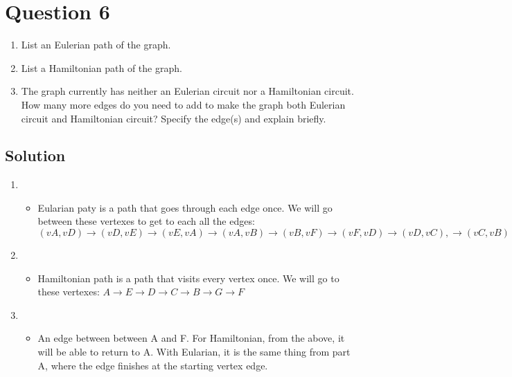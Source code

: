 \documentclass[11pt]{article}
\begin{document}
\clearpage
\section*{Question 6}

    \begin{enumerate}[label=(\alph*)]
        \item List an Eulerian path of the graph.
        \item List a Hamiltonian path of the graph.
        \item The graph currently has neither an Eulerian circuit nor a Hamiltonian circuit. How many more edges do you need to add to make the graph both Eulerian circuit and Hamiltonian circuit? Specify the edge(s) and explain briefly.
    \end{enumerate}

    \subsection*{Solution}
    \begin{enumerate}[label=(\alph*)]
        \item
        \begin{itemize}
            \item[] Eularian paty is a path that goes through each edge once. We will go between these vertexes to get to each all the edges:
            \((vA,vD) \rightarrow(vD, vE) \rightarrow (vE,vA) \rightarrow(vA,vB) \rightarrow (vB,vF) \rightarrow(vF,vD) \rightarrow(vD,vC), \rightarrow (vC,vB) \rightarrow (vvB,vG) \rightarrow (vG.vF)\)
        \end{itemize}
        \item
        \begin{itemize}
            \item[] Hamiltonian path is a path that visits every vertex once. We will go to these vertexes: \(A \rightarrow E \rightarrow D \rightarrow C \rightarrow B \rightarrow G \rightarrow F\)
        \end{itemize}
        \item
        \begin{itemize}
            \item[]  An edge between between A and F. For Hamiltonian, from the above, it will be able to return to A. With Eularian, it is the same thing from part A, where the edge finishes at the starting vertex edge. 
        \end{itemize}
    \end{enumerate}
\end{document}
